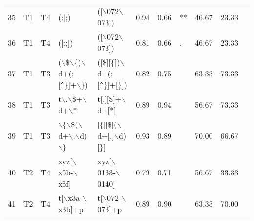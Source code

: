 \begin{table*}[ht]
\begin{tabular}{rllllrrlrrl}
  35 & T1 & T4 & (:$|$;) & ([$\backslash$072$\backslash$073]) & 0.94 & 0.66 & ** & 46.67 & 23.33 &   \\ 
  36 & T1 & T4 & ([:;]) & ([$\backslash$072$\backslash$073]) & 0.81 & 0.66 & . & 46.67 & 23.33 &   \\ 
  37 & T1 & T3 & ($\backslash$\$$\backslash$\{)$\backslash$d+(:[\verb|^|\}]+$\backslash$\}) & ([\$][\{])$\backslash$d+(:[\verb|^|\}]+[\}]) & 0.82 & 0.75 &   & 63.33 & 73.33 &   \\ 
  38 & T1 & T3 & t$\backslash$.$\backslash$\$+$\backslash$d+$\backslash$* & t[.][\$]+$\backslash$d+[*] & 0.89 & 0.94 &   & 56.67 & 73.33 &   \\ 
  39 & T1 & T3 & $\backslash$\{$\backslash$\$($\backslash$d+$\backslash$.$\backslash$d)$\backslash$\} & [\{][\$]($\backslash$d+[.]$\backslash$d)[\}] & 0.93 & 0.89 &   & 70.00 & 66.67 &   \\ 
  40 & T2 & T4 & xyz[$\backslash$x5b-$\backslash$x5f] & xyz[$\backslash$0133-$\backslash$0140] & 0.79 & 0.71 &   & 56.67 & 33.33 &   \\ 
  41 & T2 & T4 & t[$\backslash$x3a-$\backslash$x3b]+p & t[$\backslash$072-$\backslash$073]+p & 0.89 & 0.90 &   & 63.33 & 70.00 &   \\ 
   \hline
\end{tabular}
\end{table*}
